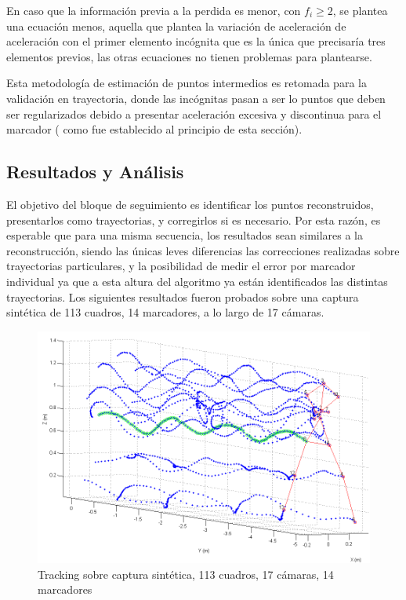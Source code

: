 En caso que la información previa a la perdida es menor, con $f_{i} \geq 2$, se plantea una ecuación menos, aquella que plantea la variación de aceleración de aceleración con el primer elemento incógnita que es la única que precisaría tres elementos previos, las otras ecuaciones no tienen problemas para plantearse.

Esta metodología de estimación de puntos intermedios es retomada para la validación en trayectoria, donde las incógnitas pasan a ser lo puntos que deben ser regularizados debido a presentar aceleración excesiva y discontinua para el marcador ( como fue establecido al principio de esta sección).




\subsection{Resultados y Análisis}

El objetivo del bloque de seguimiento es identificar los puntos reconstruidos, presentarlos como trayectorias, y corregirlos si es necesario. Por esta razón, es esperable que para una misma secuencia, los resultados sean similares a la reconstrucción, siendo las únicas leves diferencias las correcciones realizadas sobre trayectorias particulares, y la posibilidad de medir el error por marcador individual ya que a esta altura del algoritmo ya están identificados las distintas trayectorias. Los siguientes resultados fueron probados sobre una captura sintética de 113 cuadros, 14 marcadores, a lo largo de 17 cámaras.

\begin{figure}[hbt]
\begin{center}
\includegraphics[width=\linewidth]{img/Tracking/040_Salida_Tracking_Esqueleto_Trayectoria.png}
\end{center}
\caption{Tracking sobre captura sintética, 113 cuadros, 17 cámaras, 14 marcadores}
\label{Tracking_Esqueleto_Trayectoria}
\end{figure}

